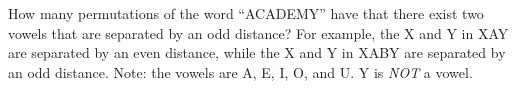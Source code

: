 How many permutations of the word ``ACADEMY'' have that there exist two vowels that are separated by an odd distance? For example, the X and Y in XAY are separated by an even distance, while the X and Y in XABY are separated by an odd distance. Note: the vowels are A, E, I, O, and U. Y is \emph{NOT} a vowel.